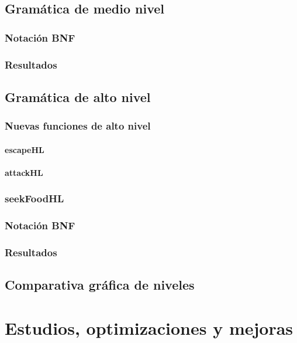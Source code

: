 \subsection{Gramática de medio nivel}

\subsubsection{Notación BNF}

\subsubsection{Resultados}

\subsection{Gramática de alto nivel}

\subsubsection{Nuevas funciones de alto nivel}

\paragraph{escapeHL}
  
\paragraph{attackHL}
  
\subsubsection{seekFoodHL}

\subsubsection{Notación BNF}

\subsubsection{Resultados}

\subsection{Comparativa gráfica de niveles}

\section{Estudios, optimizaciones y mejoras}

